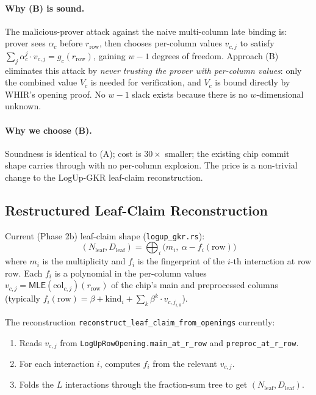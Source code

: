\paragraph{Why (B) is sound.}
The malicious-prover attack against the naive multi-column late
binding is: prover sees $\alpha_c$ before $r_{\mathrm{row}}$, then
chooses per-column values $v_{c,j}$ to satisfy
$\sum_j \alpha_c^j \cdot v_{c,j} = g_c(r_{\mathrm{row}})$, gaining
$w-1$ degrees of freedom.  Approach (B) eliminates this attack by
\emph{never trusting the prover with per-column values}: only the
combined value $V_c$ is needed for verification, and $V_c$ is bound
directly by WHIR's opening proof.  No $w-1$ slack exists because
there is no $w$-dimensional unknown.

\paragraph{Why we choose (B).}
Soundness is identical to (A); cost is $30\times$ smaller; the
existing chip commit shape carries through with no per-column
explosion.  The price is a non-trivial change to the LogUp-GKR
leaf-claim reconstruction.

\subsection{Restructured Leaf-Claim Reconstruction}

Current (Phase 2b) leaf-claim shape (\texttt{logup\_gkr.rs}):
$$
(N_{\mathrm{leaf}}, D_{\mathrm{leaf}}) =
\bigoplus_i \bigl(m_i,\ \alpha - f_i(\mathrm{row})\bigr)
$$
where $m_i$ is the multiplicity and $f_i$ is the fingerprint of the
$i$-th interaction at row $\mathrm{row}$.  Each $f_i$ is a polynomial
in the per-column values $v_{c,j} = \mathsf{MLE}(\mathrm{col}_{c,j})
(r_{\mathrm{row}})$ of the chip's main and preprocessed columns
(typically $f_i(\mathrm{row}) = \beta + \mathrm{kind}_i + \sum_k
\beta^k \cdot v_{c,j_{i,k}}$).

The reconstruction
\texttt{reconstruct\_leaf\_claim\_from\_openings} currently:
\begin{enumerate}
  \item Reads $v_{c,j}$ from \texttt{LogUpRowOpening.main\_at\_r\_row}
        and \texttt{preproc\_at\_r\_row}.
  \item For each interaction $i$, computes $f_i$ from the relevant
        $v_{c,j}$.
  \item Folds the $L$ interactions through the fraction-sum tree to
        get $(N_{\mathrm{leaf}}, D_{\mathrm{leaf}})$.
\end{enumerate}

